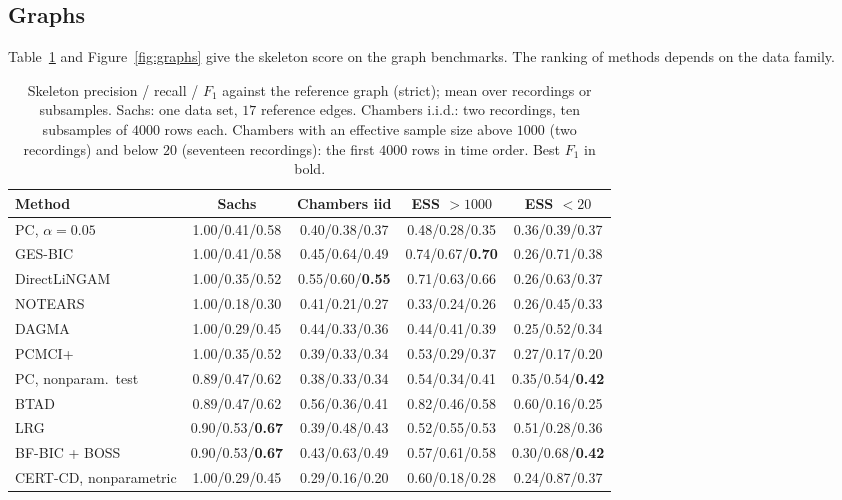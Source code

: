 \subsection{Graphs}\label{sec:graphs}

Table~\ref{tab:graphs} and Figure~\ref{fig:graphs} give the skeleton score on the graph
benchmarks. The ranking of methods depends on the data family.

\begin{table}[t]
\caption{Skeleton precision / recall / $F_1$ against the reference graph (strict); mean over
recordings or subsamples. Sachs: one data set, $17$ reference edges. Chambers i.i.d.: two
recordings, ten subsamples of $4000$ rows each. Chambers with an effective sample size above
$1000$ (two recordings) and below $20$ (seventeen recordings): the first $4000$ rows in time
order. Best $F_1$ in bold.}
\label{tab:graphs}
\scriptsize
\setlength{\tabcolsep}{2pt}
\begin{tabular}{@{}lcccc@{}}
\toprule
Method & Sachs & Chambers iid & ESS $>1000$ & ESS $<20$\\
\midrule
PC, $\alpha=0.05$ & 1.00/0.41/0.58 & 0.40/0.38/0.37 & 0.48/0.28/0.35 & 0.36/0.39/0.37\\
GES-BIC & 1.00/0.41/0.58 & 0.45/0.64/0.49 & 0.74/0.67/\textbf{0.70} & 0.26/0.71/0.38\\
DirectLiNGAM & 1.00/0.35/0.52 & 0.55/0.60/\textbf{0.55} & 0.71/0.63/0.66 & 0.26/0.63/0.37\\
NOTEARS & 1.00/0.18/0.30 & 0.41/0.21/0.27 & 0.33/0.24/0.26 & 0.26/0.45/0.33\\
DAGMA & 1.00/0.29/0.45 & 0.44/0.33/0.36 & 0.44/0.41/0.39 & 0.25/0.52/0.34\\
PCMCI+ & 1.00/0.35/0.52 & 0.39/0.33/0.34 & 0.53/0.29/0.37 & 0.27/0.17/0.20\\
PC, nonparam.\ test & 0.89/0.47/0.62 & 0.38/0.33/0.34 & 0.54/0.34/0.41 & 0.35/0.54/\textbf{0.42}\\
BTAD & 0.89/0.47/0.62 & 0.56/0.36/0.41 & 0.82/0.46/0.58 & 0.60/0.16/0.25\\
LRG & 0.90/0.53/\textbf{0.67} & 0.39/0.48/0.43 & 0.52/0.55/0.53 & 0.51/0.28/0.36\\
BF-BIC + BOSS & 0.90/0.53/\textbf{0.67} & 0.43/0.63/0.49 & 0.57/0.61/0.58 & 0.30/0.68/\textbf{0.42}\\
CERT-CD, nonparametric & 1.00/0.29/0.45 & 0.29/0.16/0.20 & 0.60/0.18/0.28 & 0.24/0.87/0.37\\
\bottomrule
\end{tabular}
\end{table}

